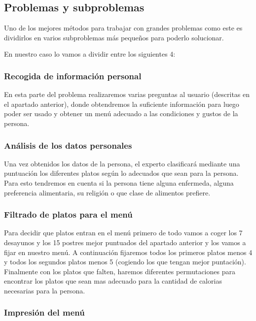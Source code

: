 \documentclass[12]{article}
\begin{document}
\subsection{Problemas y subproblemas}

Uno de los mejores métodos para trabajar con grandes problemas como este es dividirlos en varios subproblemas más pequeños para poderlo solucionar.

En nuestro caso lo vamos a dividir entre los siguientes 4:

\subsubsection{Recogida de información personal}

En esta parte del problema realizaremos varias preguntas al usuario (descritas en el apartado anterior), donde obtendremos la suficiente información para luego poder ser usado y obtener un menú adecuado a las condiciones y gustos de la persona.

\subsubsection{Análisis de los datos personales}

Una vez obtenidos los datos de la persona, el experto clasificará mediante una puntuación los diferentes platos según lo adecuados que sean para la persona. Para esto tendremos en cuenta si la persona tiene alguna enfermeda, alguna preferencia alimentaria, su religión o que clase de alimentos prefiere.

\subsubsection{Filtrado de platos para el menú}

Para decidir que platos entran en el menú primero de todo vamos a coger los 7 desayunos y los 15 postres mejor puntuados del apartado anterior y los vamos a fijar en nuestro menú. A continuación fijaremos todos los primeros platos menos 4 y todos los segundos platos menos 5 (cogiendo los que tengan mejor puntación).
Finalmente con los platos que falten, haremos diferentes permutaciones para encontrar los platos que sean mas adecuado para la cantidad de calorias necesarias para la persona.

\subsubsection{Impresión del menú}
\end{document}
